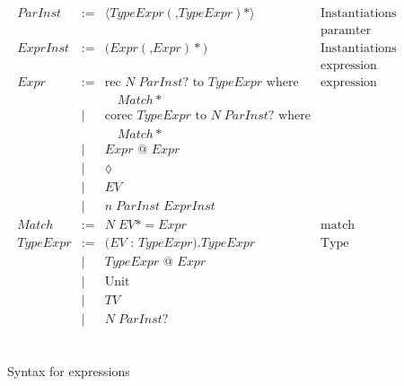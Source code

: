 \documentclass[a4paper,cleardoubleempty,BCOR1cm]{scrbook}
\begin{document}
\begin{figure}
 \begin{align*}
   \begin{array}{llll}
     ParInst &:= &\langle TypeExpr(\text{,}TypeExpr)*\rangle &\text{Instantiations for}\\
                                                            &&&\text{paramter contexts}\\
     ExprInst &:= &\text{(}Expr(\text{,}Expr)*\text{)} &\text{Instantiations for}\\
                                                       &&&\text{expression contexts}\\
     Expr &:= &\text{rec } N \; ParInst? \text{ to } TypeExpr \text{ where} &\text{expression}\\
     &&\quad Match*&\\
     &| &\text{corec } TypeExpr \text { to } N \; ParInst? \text{ where}&\\
     &&\quad Match*&\\
     &| &Expr\text{ @ }Expr &\\
     &| &\lozenge&\\
     &| &EV&\\
     &| &n\; ParInst\; ExprInst&\\
     Match &:= &N\; EV* = Expr &\text{match}\\
     TypeExpr &:= &\text{(}EV\text{ : }TypeExpr\text{).}TypeExpr &\text{Type expressions}\\
     &| &TypeExpr\text{ @ }Expr&\\
     &| &\text{Unit} &\\
     &| &TV&\\
     &| &N\; ParInst? &\\
  \end{array}
\end{align*}
\begin{lstlisting}
\end{lstlisting}
\caption{Syntax for expressions}
\label{syntax-for-expressions}
\end{figure}
\end{document}
